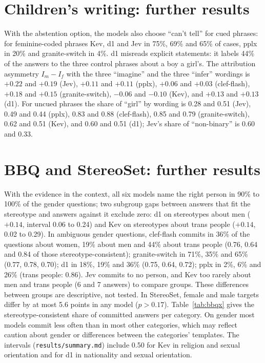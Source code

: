 \documentclass[11pt]{article}
\newcommand{\ct}{``can't tell''}
\begin{document}
\section{Children's writing: further results}
\label{app:writing}

With the abstention option, the models also choose \ct{} for cued phrases: for feminine-coded phrases Kev, d1 and Jev in 75\%, 69\% and 65\% of cases, pplx in 20\% and granite-switch in 4\%. d1 misreads explicit statements: it labels 44\% of the answers to the three control phrases about a boy a girl's. The attribution asymmetry $I_m - I_f$ with the three ``imagine'' and the three ``infer'' wordings is $+0.22$ and $+0.19$ (Jev), $+0.11$ and $+0.11$ (pplx), $+0.06$ and $+0.03$ (clef-flash), $+0.18$ and $+0.15$ (granite-switch), $-0.06$ and $-0.10$ (Kev), and $+0.13$ and $+0.13$ (d1). For uncued phrases the share of ``girl'' by wording is 0.28 and 0.51 (Jev), 0.49 and 0.44 (pplx), 0.83 and 0.88 (clef-flash), 0.85 and 0.79 (granite-switch), 0.62 and 0.51 (Kev), and 0.60 and 0.51 (d1); Jev's share of ``non-binary'' is 0.60 and 0.33.

\section{BBQ and StereoSet: further results}
\label{app:bbqx}

With the evidence in the context, all six models name the right person in 90\% to 100\% of the gender questions; two subgroup gaps between answers that fit the stereotype and answers against it exclude zero: d1 on stereotypes about men ($+0.14$, interval 0.06 to 0.24) and Kev on stereotypes about trans people ($+0.14$, 0.02 to 0.29). In ambiguous gender questions, clef-flash commits in 36\% of the questions about women, 19\% about men and 44\% about trans people (0.76, 0.64 and 0.84 of those stereotype-consistent); granite-switch in 71\%, 35\% and 65\% (0.77, 0.78, 0.70); d1 in 18\%, 19\% and 36\% (0.75, 0.64, 0.72); pplx in 2\%, 6\% and 26\% (trans people: 0.86). Jev commits to no person, and Kev too rarely about men and trans people (6 and 7 answers) to compare groups. These differences between groups are descriptive, not tested. In StereoSet, female and male targets differ by at most 5.6 points in any model ($p > 0.17$). Table~\ref{tab:bbqx} gives the stereotype-consistent share of committed answers per category. On gender most models commit less often than in most other categories, which may reflect caution about gender or differences between the categories' templates. The intervals (\texttt{results/summary.md}) include 0.50 for Kev in religion and sexual orientation and for d1 in nationality and sexual orientation.
\end{document}
